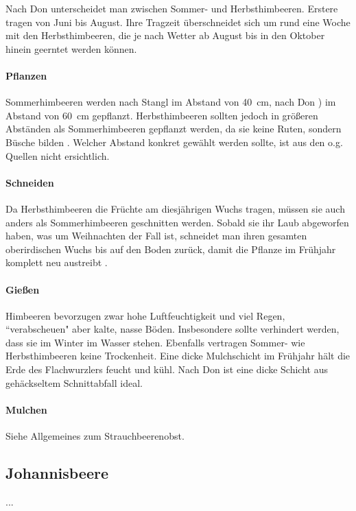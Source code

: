 Nach Don \cite[S.~420]{Don2021} unterscheidet man zwischen Sommer- und Herbsthimbeeren.
Erstere tragen von Juni bis August.
Ihre Tragzeit überschneidet sich um rund eine Woche mit den Herbsthimbeeren, die je nach Wetter ab August bis in den Oktober hinein geerntet werden können.

\paragraph{Pflanzen}

Sommerhimbeeren werden nach Stangl \cite{Stangl1995} im Abstand von 40~cm, nach Don \cite[S.~420]{Don2021}) im Abstand von 60~cm gepflanzt.
Herbsthimbeeren sollten jedoch in größeren Abständen als Sommerhimbeeren gepflanzt werden, da sie keine Ruten, sondern Büsche bilden \cite[S.~420]{Don2021}.
Welcher Abstand konkret gewählt werden sollte, ist aus den o.g. Quellen nicht ersichtlich.

\paragraph{Schneiden}

Da Herbsthimbeeren die Früchte am diesjährigen Wuchs tragen, müssen sie auch anders als Sommerhimbeeren geschnitten werden.
Sobald sie ihr Laub abgeworfen haben, was um Weihnachten der Fall ist, schneidet man ihren gesamten oberirdischen Wuchs bis auf den Boden zurück, damit die Pflanze im Frühjahr komplett neu austreibt \cite[S.~421]{Don2021}.

\paragraph{Gießen}

Himbeeren bevorzugen zwar hohe Luftfeuchtigkeit und viel Regen, ``verabscheuen" aber kalte, nasse Böden.
Insbesondere sollte verhindert werden, dass sie im Winter im Wasser stehen.
Ebenfalls vertragen Sommer- wie Herbsthimbeeren keine Trockenheit.
Eine dicke Mulchschicht im Frühjahr hält die Erde des Flachwurzlers feucht und kühl.
Nach Don \cite[S.~421]{Don2021} ist eine dicke Schicht aus gehäckseltem Schnittabfall ideal.

\paragraph{Mulchen}

Siehe Allgemeines zum Strauchbeerenobst.

\subsection{Johannisbeere}
...

